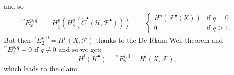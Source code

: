 \documentclass[12pt]{article}
\newcommand{\F}{\mathcal F}
\begin{document}
and so
$$
\begin{aligned}
{^{\prime\prime}\!E^{p,q}_2}
&=H^p_{\bar\partial}(H^q_\partial(\check C^\bullet(\mathcal U,\F^\bullet)))
&=
\begin{cases}
H^p(\F^\bullet(X)) & \text{if $q=0$} \\
0 & \text{if $q\ge 1$}.
\end{cases}
\end{aligned}
$$
But then ${^{\prime\prime}\!E^{p,0}_2}=H^p(X,\F)$ thanks to the De Rham-Weil theorem and ${^{\prime\prime}\!E^{p,q}_2}=0$ if $q\ne 0$ and so we get:
$$
H^l(K^\bullet)={^{\prime\prime}\!E^{l,0}_2}=H^l(X,\F),
$$
which leads to the claim.
\end{document}
